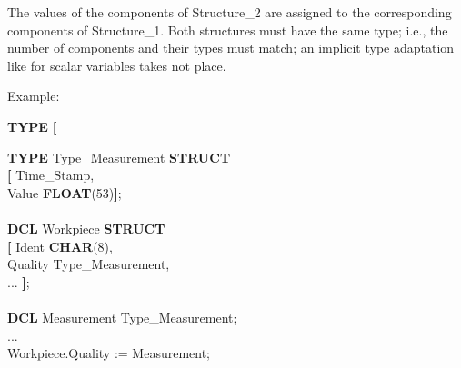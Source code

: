 The values of the components of Structure\_2 are assigned to the
corresponding components of Structure\_1. Both structures must have the same
type; i.e., the number of components and their types must match; an
implicit type adaptation like for scalar variables takes not place.

Example:

\begin{tabbing}
{\bf TYPE} \= {\bf [} \= \kill

{\bf TYPE} \>         \> Type\_Measurement {\bf STRUCT}\\
    \> {\bf [} \> Time\_Stamp, \\
    \>         \> Value {\bf FLOAT}(53){\bf ]};\\
    \>         \> \\
{\bf DCL}  \>         \> Workpiece {\bf STRUCT} \\
    \> {\bf [} \> Ident {\bf CHAR}(8),\\
    \>         \> Quality Type\_Measurement,\\
    \>         \> ... {\bf ]};\\
    \>         \> \\
{\bf DCL}  \>         \> Measurement Type\_Measurement;\\
...        \>         \> \\
Workpiece.Quality := Measurement;
\end{tabbing}

